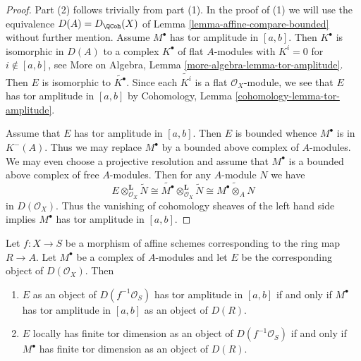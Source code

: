 \begin{proof}
Part (2) follows trivially from part (1). In the proof of (1) we will
use the equivalence $D(A) = D_\QCoh(X)$ of
Lemma \ref{lemma-affine-compare-bounded}
without further mention.
Assume $M^\bullet$ has tor amplitude in $[a, b]$. Then $K^\bullet$
is isomorphic in $D(A)$ to a complex $K^\bullet$ of flat $A$-modules
with $K^i = 0$ for $i \not \in [a, b]$, see
More on Algebra, Lemma \ref{more-algebra-lemma-tor-amplitude}.
Then $E$ is isomorphic to $\widetilde{K^\bullet}$. Since each
$\widetilde{K^i}$ is a flat $\mathcal{O}_X$-module, we see
that $E$ has tor amplitude in $[a, b]$ by
Cohomology, Lemma \ref{cohomology-lemma-tor-amplitude}.

\medskip\noindent
Assume that $E$ has tor amplitude in $[a, b]$. Then $E$ is bounded
whence $M^\bullet$ is in $K^-(A)$. Thus we may replace $M^\bullet$
by a bounded above complex of $A$-modules. We may even choose
a projective resolution and assume that $M^\bullet$ is a bounded above
complex of free $A$-modules. Then for any $A$-module $N$ we have
$$
E \otimes_{\mathcal{O}_X}^\mathbf{L} \widetilde{N}
\cong
\widetilde{M^\bullet} \otimes_{\mathcal{O}_X}^\mathbf{L} \widetilde{N}
\cong
\widetilde{M^\bullet \otimes_A N}
$$
in $D(\mathcal{O}_X)$. Thus the vanishing of cohomology sheaves of
the left hand side implies $M^\bullet$ has tor amplitude in $[a, b]$.
\end{proof}

\begin{lemma}
\label{lemma-tor-dimension-rel-affine}
Let $f : X \to S$ be a morphism of affine schemes corresponding
to the ring map $R \to A$. Let $M^\bullet$ be a
complex of $A$-modules and let $E$ be the corresponding object
of $D(\mathcal{O}_X)$. Then
\begin{enumerate}
\item $E$ as an object of $D(f^{-1}\mathcal{O}_S)$ has tor amplitude in
$[a, b]$ if and only if $M^\bullet$ has tor amplitude in $[a, b]$
as an object of $D(R)$.
\item $E$ locally has finite tor dimension as an object of
$D(f^{-1}\mathcal{O}_S)$ if and only if $M^\bullet$
has finite tor dimension as an object of $D(R)$.
\end{enumerate}
\end{lemma}


